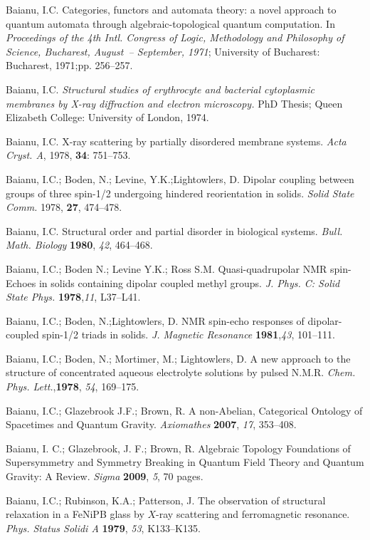 \documentclass[12pt]{article}
\theoremstyle{plain}
\theoremstyle{definition}
\numberwithin{equation}{section}
\begin{document}
\begin{thebibliography}{99}
Baianu, I.C. Categories, functors and automata theory: a novel approach to quantum automata through algebraic-topological quantum computation. In {\em Proceedings of the 4th Intl. Congress of Logic, Methodology and Philosophy of Science, Bucharest, August~-- September, 1971}; University of Bucharest: Bucharest, 1971;pp. 256--257.

Baianu, I.C. \emph{Structural studies of erythrocyte and bacterial cytoplasmic membranes by X-ray diffraction and electron microscopy.} PhD Thesis; Queen Elizabeth College: University of London, 1974.

Baianu, I.C. X-ray scattering by partially disordered membrane systems.
\emph{Acta Cryst. A}, 1978, {\bf 34}: 751--753.

Baianu, I.C.; Boden, N.; Levine, Y.K.;Lightowlers, D. Dipolar coupling between groups of three spin-1/2 undergoing hindered reorientation in solids. {\it Solid State Comm.} 1978, {\bf 27}, 474--478.

Baianu, I.C. Structural order and partial disorder in biological systems. {\em Bull. Math. Biology} {\bf 1980}, {\em 42}, 464--468.

Baianu, I.C.; Boden N.; Levine Y.K.; Ross S.M. Quasi-quadrupolar NMR spin-Echoes in solids containing dipolar coupled methyl groups. {\em J. Phys. C: Solid State Phys.}
{\bf 1978},{\em 11}, L37--L41.

Baianu, I.C.; Boden, N.;Lightowlers, D. NMR spin-echo responses of dipolar-coupled spin-1/2 triads in solids. {\em J. Magnetic Resonance} {\bf 1981},{\em 43}, 101--111.

Baianu, I.C.; Boden, N.; Mortimer, M.; Lightowlers, D. A new approach to the structure of concentrated aqueous electrolyte solutions by pulsed N.M.R. {\em Chem. Phys. Lett.},{\bf 1978}, {\em 54}, 169--175.

Baianu, I.C.; Glazebrook J.F.; Brown, R. A non-Abelian, Categorical Ontology of Spacetimes and Quantum Gravity. {\em Axiomathes} {\bf 2007}, {\em 17}, 353--408.

Baianu, I. C.; Glazebrook, J. F.; Brown, R. Algebraic Topology Foundations of Supersymmetry and Symmetry Breaking in Quantum Field Theory and Quantum Gravity: A Review.
{\em Sigma} {\bf 2009}, {\em 5}, 70 pages.

Baianu, I.C.; Rubinson, K.A.; Patterson, J. The observation of structural relaxation in a FeNiPB glass by $X$-ray scattering and ferromagnetic resonance. {\em Phys. Status
Solidi A} {\bf 1979}, {\em 53}, K133--K135.


\end{thebibliography}
\end{document}
